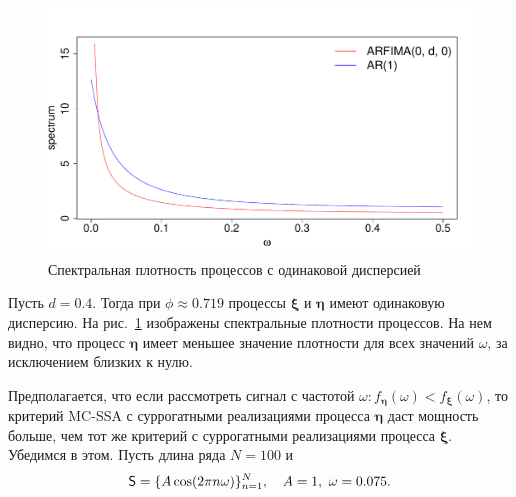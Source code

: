 \documentclass[specialist,
substylefile = spbu_report.rtx,
subf,href,colorlinks=true, 12pt]{disser}
\theoremstyle{definition}
\begin{document}
\begin{figure}
	\includegraphics[width=\textwidth]{img/spectrum.pdf}
	\caption{Спектральная плотность процессов с одинаковой дисперсией}
	\label{fig:spectrum}
\end{figure}

Пусть $d=0.4$. Тогда при $\phi\approx0.719$ процессы $\bm\xi$ и $\bm\eta$ имеют одинаковую дисперсию. На рис.~\ref{fig:spectrum} изображены спектральные плотности процессов. На нем видно, что процесс $\bm\eta$ имеет меньшее значение плотности для всех значений $\omega$, за исключением близких к нулю.

Предполагается, что если рассмотреть сигнал с частотой $\omega:f_{\bm\eta}(\omega) < f_{\bm\xi}(\omega)$, то критерий MC-SSA с суррогатными реализациями процесса $\bm\eta$ даст мощность больше, чем тот же критерий с суррогатными реализациями процесса $\bm\xi$. Убедимся в этом. Пусть длина ряда $N=100$ и
\[
	\mathsf{S} = \{A\cos(2 \pi n \omega)\}_{n=1}^N,\quad A=1,\ \omega=0.075.
\]
\end{document}
